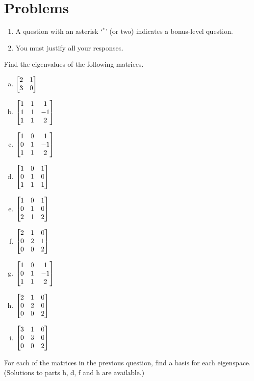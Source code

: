 \section*{Problems}


\begin{enumerate}
\item A question with an asterisk `$ ^\ast$' (or two) indicates a bonus-level question.
 \item You must justify all your responses.
\end{enumerate}
\bigskip


\begin{prob} \label{prob22.1} Find the eigenvalues of the following matrices. 
\medskip
\begin{enumerate}[a)]
 
\item $\bmatrix
2&1\\3&0 \endbmatrix $
\medskip
\item\sov  $\bmatrix 
1&1&1\\1&1&-1\\1&1&2 \endbmatrix $
\medskip
\item $\bmatrix 
1&0&1\\0&1&-1\\1&1&2 \endbmatrix $
\medskip

\item\sov $\bmatrix 
1&0&1\\0&1&0\\1&1&1 \endbmatrix $
\medskip
\item $\bmatrix 
1&0&1\\0&1&0\\2&1&2 \endbmatrix $
\medskip
\item\sov $\bmatrix 
2&1&0\\0&2&1\\0&0&2 \endbmatrix $
\medskip
\item $\bmatrix 
1&0&1\\0&1&-1\\1&1&2 \endbmatrix $\medskip
\item\sov $\bmatrix 
2&1&0\\0&2&0\\0&0&2 \endbmatrix $
\medskip
\item $\bmatrix 
3&1&0\\0&3&0\\0&0&2 \endbmatrix $
\medskip
 
\end{enumerate}

\end{prob} \begin{prob} \label{prob22.2} For each of the matrices  in the previous question, find a basis for each eigenspace. (Solutions to parts b, d, f and h are available.)\medskip
% 

\end{prob}